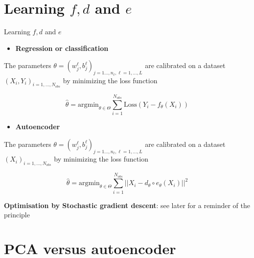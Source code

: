 \documentclass[
  12pt,
  ignorenonframetext,
  compress]{beamer}
\providecommand{\tightlist}{%
  \setlength{\itemsep}{0pt}\setlength{\parskip}{0pt}}
\begin{document}
\begin{frame}
\end{frame}

\hypertarget{learning-fd-and-e}{%
\section{\texorpdfstring{Learning \(f,d\) and
\(e\)}{Learning f,d and e}}\label{learning-fd-and-e}}

\begin{frame}{Learning \(f,d\) and \(e\)}
\begin{itemize}
\tightlist
\item
  \textbf{Regression or classification}
\end{itemize}

The parameters
\(\theta = (w^\ell_j,b^\ell_j)_{j = 1\dots,n_\ell, \ell = 1,\dots,L}\)
are calibrated on a dataset \((X_i,Y_i)_{i=1, \dots , N_{obs}}\) by
minimizing the loss function

\[\widehat{\theta} = \mbox{argmin}_{\theta \in\Theta}  \sum_{i=1}^{N_{obs}}\mbox{Loss}(Y_i - f_{\theta}(X_i))\]

\begin{itemize}
\tightlist
\item
  \textbf{Autoencoder}
\end{itemize}

The parameters
\(\theta = (w^\ell_j,b^\ell_j)_{j = 1\dots,n_\ell, \ell = 1,\dots,L}\)
are calibrated on a dataset \((X_i)_{i=1, \dots , N_{obs}}\) by
minimizing the loss function

\[\widehat{\theta} = \mbox{argmin}_{\theta \in\Theta}  \sum_{i=1}^{N_{obs}}||X_i - d_{\theta}\circ e_{\theta}(X_i)||^2\]

\textbf{Optimisation by Stochastic gradient descent}: see later for a
reminder of the principle
\end{frame}

\begin{frame}
\end{frame}

\hypertarget{pca-versus-autoencoder}{%
\section{PCA versus autoencoder}\label{pca-versus-autoencoder}}
\end{document}
